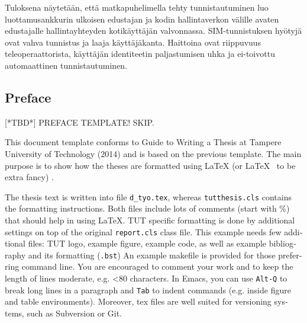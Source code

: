 \documentclass[12pt,a4paper,english]{tutthesis}
\begin{document}
\begin{otherlanguage}{finnish}
Tuloksena näytetään, että matkapuhelimella tehty tunnistautuminen luo 
luottamusankkurin ulkoisen edustajan ja kodin hallintaverkon välille avaten edustajalle hallintayhteyden kotikäyttäjän valvonnassa.
SIM-tunnistuksen hyötyjä ovat vahva tunnistus
 ja laaja  käyttäjäkanta. Haittoina ovat
 riippuvuus teleoperaattorista, käyttäjän identiteetin
paljastumisen uhka ja ei-toivottu automaattinen tunnistautuminen.
\end{otherlanguage}

\begin{otherlanguage}{english} %
\makeatother %

%
%
\chapter*{Preface}

[*TBD*]
PREFACE TEMPLATE! SKIP.

This document template conforms to Guide to Writing a Thesis at
Tampere University of Technology (2014) and is based on the previous
template. The main purpose is to show how the theses are formatted
using LaTeX (or \LaTeX ~ to be extra fancy) .


The thesis text is written into file \texttt{d\_tyo.tex}, whereas
\texttt{tutthesis.cls} contains the formatting instructions. Both
files include lots of comments (start with \%) that should help in
using LaTeX. TUT specific formatting is done by additional settings on
top of the original \texttt{report.cls} class file. This example needs
few additional files: TUT logo, example figure, example code, as well
as example bibliography and its formatting (\texttt{.bst}) An example
makefile is provided for those preferring command line. You are
encouraged to comment your work and to keep the length of lines
moderate, e.g. <80 characters. In Emacs, you can use \texttt{Alt-Q} to
break long lines in a paragraph and \texttt{Tab} to indent commands
(e.g. inside figure and table environments). Moreover, tex files are
well suited for versioning systems, such as Subversion or Git.  


\end{otherlanguage}
\end{document}
